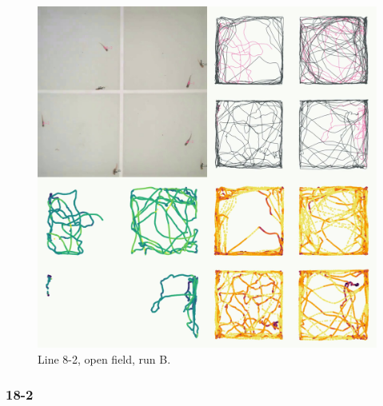 \documentclass[
]{book}
\begin{document}
\begin{figure}
\includegraphics[width=1\linewidth]{figs/mikk_behaviour/four_panel_plots/open_field_20191118_1224_8-2_R_B_300} \caption{Line 8-2, open field, run B.}\label{fig:4p-8-2-of-B}
\end{figure}

\hypertarget{section-1}{%
\subsubsection{18-2}\label{section-1}}
\end{document}
